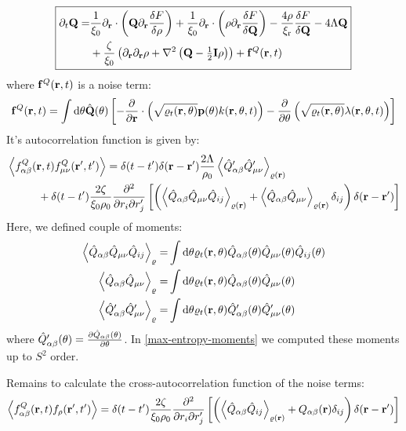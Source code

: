 \documentclass[a5paper]{article}
\begin{document}
\begin{equation}
\label{Q-equation}
\boxed{
\begin{aligned}
    \partial_t \mathbf{Q} =& 
    \frac{1}{\xi_0}\partial_{\mathbf{r}} \cdot\left(\mathbf{Q} \partial_{\mathbf{r}} \frac{\delta F}{\delta \rho}\right)
    +\frac{1}{\xi_0}\partial_{\mathbf{r}} \cdot\left(\rho\partial_{\mathbf{r}} \frac{\delta F}{\delta \mathbf{Q}}\right)
    -\frac{4\rho}{\xi_{\rm r}}\frac{\delta F}{\delta \mathbf{Q}} -4\Lambda \mathbf{Q}
    \\
    &+\frac{\zeta}{\xi_0}\left(\partial_{\mathbf{r}}\partial_{\mathbf{r}} \rho + \nabla^2 \left(\mathbf{Q} -\tfrac{1}{2}\mathbf{I} \rho\right) \right) + \mathbf{f}^Q(\mathbf{r}, t)
\end{aligned}
}
\end{equation}
where $\mathbf{f}^Q(\mathbf{r}, t)$ is a noise term:
\begin{align}
    \mathbf{f}^Q(\mathbf{r}, t) =\int \mathrm{d}\theta \hat{\mathbf{Q}}(\theta) \left[-
    \frac{\partial }{\partial \mathbf{r}}\cdot\left(\sqrt{\varrho_t(\mathbf{r}, \theta)} \mathbf{p}(\theta) k(\mathbf{r}, \theta, t)\right)
    - \frac{\partial }{\partial \theta}\left(\sqrt{\varrho_t(\mathbf{r}, \theta)} \lambda(\mathbf{r}, \theta, t)\right)
    \right]
\end{align}
It's autocorrelation function is given by:
\begin{align}
    \label{Q-noise-autocorrelation}
    &\left\langle f^Q_{\alpha\beta}(\mathbf{r}, t) f^Q_{\mu\nu}(\mathbf{r}', t') \right\rangle = 
    \delta(t-t') \delta(\mathbf{r}-\mathbf{r}') \frac{2\Lambda}{\rho_0} \left\langle \hat Q'_{\alpha\beta} \hat Q'_{\mu\nu}\right\rangle_{\varrho(\mathbf{r})}
    \\
    &\hspace{1cm}+\delta(t-t')\frac{2\zeta}{\xi_0\rho_0} 
    \frac{\partial^2}{\partial r_i \partial r'_j}\left[\left(
        \left\langle \hat Q_{\alpha\beta} \hat Q_{\mu\nu} \hat Q_{ij}\right\rangle_{\varrho(\mathbf{r})}
        +\left\langle \hat Q_{\alpha\beta} \hat Q_{\mu\nu}\right\rangle_{\varrho(\mathbf{r})} \delta_{ij}
    \right)\delta(\mathbf{r}-\mathbf{r}')
    \right]
\end{align}
Here, we defined couple of moments:
\begin{align}
    \left\langle \hat Q_{\alpha\beta} \hat Q_{\mu\nu} \hat Q_{ij}\right\rangle_\varrho =& \int\mathrm{d}\theta \varrho_t(\mathbf{r}, \theta) \hat Q_{\alpha\beta}(\theta) \hat Q_{\mu\nu}(\theta) \hat Q_{ij}(\theta) 
    \\
    \left\langle \hat Q_{\alpha\beta} \hat Q_{\mu\nu}\right\rangle_\varrho =& \int\mathrm{d}\theta \varrho_t(\mathbf{r}, \theta) 
    \hat Q_{\alpha\beta}(\theta) \hat Q_{\mu\nu}(\theta)
    \\
    \left\langle \hat Q'_{\alpha\beta} \hat Q'_{\mu\nu}\right\rangle_\varrho =& \int\mathrm{d}\theta \varrho_t(\mathbf{r}, \theta) \hat Q'_{\alpha\beta}(\theta) \hat Q'_{\mu\nu}(\theta)
\end{align}
where $\hat Q'_{\alpha\beta}(\theta) = \frac{\partial \hat Q_{\alpha\beta}(\theta)}{\partial \theta}$. In \cref{max-entropy-moments} we computed these moments up to $S^2$ order.

Remains to calculate the cross-autocorrelation function of the noise terms:
\begin{align}
    \label{noise-cross-autocorrelation}
    \left\langle f^Q_{\alpha\beta}(\mathbf{r}, t) f_\rho(\mathbf{r}', t') \right\rangle = \delta(t-t')\frac{2\zeta}{\xi_0\rho_0} \frac{\partial^2}{\partial r_i \partial r'_j}\left[
        \left(\left\langle \hat Q_{\alpha\beta} \hat Q_{ij} \right\rangle_{\varrho(\mathbf{r})} + Q_{\alpha\beta}(\mathbf{r}) \delta_{ij}\right)
        \delta(\mathbf{r}-\mathbf{r}')
    \right]
\end{align}
\end{document}
